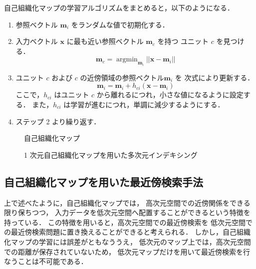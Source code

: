 自己組織化マップの学習アルゴリズムをまとめると，以下のようになる．
\begin{enumerate}
\item	参照ベクトル $\mathbf{m}_i$ をランダムな値で初期化する．
\item	入力ベクトル $\mathbf{x}$ に最も近い参照ベクトル $\mathbf{m}_c$ を持つ
ユニット $c$ を見つける．
\begin{equation}
\mathbf{m}_c = \mathop{\mbox{argmin}}_{\mathbf{m}_i} || \mathbf{x} - \mathbf{m}_i ||
\end{equation}
\item	ユニット $c$ および $c$ の近傍領域の参照ベクトル$\mathbf{m}_i$ を
次式により更新する．
\begin{equation}
\mathbf{m}_i = \mathbf{m}_i + h_{ci} ( \mathbf{x} - \mathbf{m}_i )
\end{equation}
ここで，$h_{ci}$ はユニット $c$ から離れるにつれ，小さな値になるように設定する．
また，$h_{ci}$ は学習が進むにつれ，単調に減少するようにする．
\item	ステップ 2 より繰り返す．
\end{enumerate}

\begin{figure}
\begin{center}
\end{center}
\caption{自己組織化マップ}
\label{Fig:SOM}
\end{figure}

\begin{figure*}[t]
\begin{center}
\end{center}
\caption{1 次元自己組織化マップを用いた多次元インデキシング}
\label{Fig:SOMIndexing}
\end{figure*}

\subsection{自己組織化マップを用いた最近傍検索手法}

上で述べたように，自己組織化マップでは，
高次元空間での近傍関係をできる限り保ちつつ，
入力データを低次元空間へ配置することができるという特徴を持っている．
この特徴を用いると，高次元空間での最近傍検索を
低次元空間での最近傍検索問題に置き換えることができると考えられる．
しかし，自己組織化マップの学習には誤差がともなううえ，
低次元のマップ上では，高次元空間での距離が保存されていないため，
低次元マップだけを用いて最近傍検索を行なうことは不可能である．

